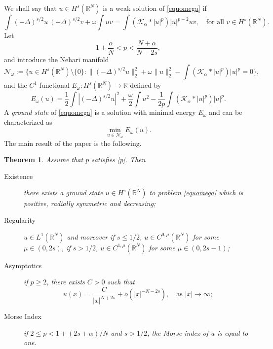 \documentclass[10pt]{amsart}
\numberwithin{equation}{section}
\newtheorem{theorem}{Theorem}[section]
\begin{document}
\medskip

We shall say that $u\in H^{s}({{\mathbb R}}^N)$ is a weak solution of \eqref{equomega} if
$$
\int (-\Delta)^{s/2} u \ (-\Delta)^{s/2} v +\omega \int u v =\int {{(\mathcal K_{\alpha}*|u|^{p})}} |u|^{p-2}u v,\quad\text{for all $v \in {H^{s}(\mathbb R^{N})}$}.
$$
Let 
\begin{equation}
\label{p}
1+\frac{\alpha}{N} < p <\frac{N+\alpha}{N-2s},
\end{equation}
and introduce the Nehari manifold
$$ 
\mathcal N_{\omega}:=\Big\{u\in {H^{s}(\mathbb R^{N})}\setminus\{0\}: \|(-\Delta)^{s/2}u\|^{2}_2+\omega\|u\|_{2}^{2}-\int {{(\mathcal K_{\alpha}*|u|^{p})}} |u|^{p}=0\Big\},
$$
and the $C^1$ functional $E_\omega:H^s({{\mathbb R}}^N)\to {{\mathbb R}}$ defined by
\begin{equation}
\label{Eomega}
E_{\omega}(u)=\frac{1}{2}\int |(-\Delta)^{s/2}u|^{2} +\frac{\omega}{2}\int u^{2}-\frac{1}{2p}\int {{(\mathcal K_{\alpha}*|u|^{p})}} |u|^{p}.
\end{equation}
A {\sl ground state} of \eqref{equomega} is a solution with minimal energy $E_{\omega}$ and can be characterized as
$$
\min_{u\in \mathcal N_{\omega}} E_{\omega}(u).
$$
The main result of the paper is the following.
\begin{theorem}\label{EXMinimo-Intro}
Assume that $p$ satisfies \eqref{p}. Then
\begin{description}
\item[Existence]
 there exists a ground state  $u\in H^s({{\mathbb R}}^N)$ to problem \eqref{equomega}
which is positive, radially symmetric and
decreasing;
\item[Regularity]
$u\in L^{1}(\mathbb R^{N})$ and moreover
if $s\leq 1/2$, $u\in C^{0,\mu}(\mathbb{R}^N)$ for some $\mu\in (0,2s)$,
if  $s>1/2$, $u\in  C^{1,\mu}(\mathbb{R}^N)$ for some $\mu \in (0,2s-1)$;

\item[Asymptotics] if $p\geq 2$, there exists $C>0$ such that
$$
u(x)=\frac{C}{|x|^{N+2s}}+o( |x|^{-N-2s}), \quad  \text{as $|x|\to\infty$};
$$
\item[Morse Index]
 if $2\leq p<1+(2s+\alpha)/N$ and $s> 1/2$, the Morse index of $u$ is equal to one.
\end{description}
\end{theorem}
\end{document}
